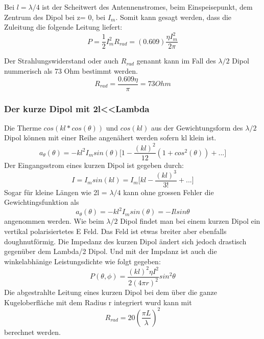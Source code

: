 Bei $l=\lambda/4 $ ist der Scheitwert des Antennenstromes, beim Einspeisepunkt, dem Zentrum des Dipol bei z= 0, bei $I_{m}$. Somit kann gesagt werden, dass die Zuleitung  die folgende Leitung  liefert:
\begin{equation}
P=\frac{1}{2} I_{m}^{2}R_{rad}=(0.609)\frac{\eta I_{m}^{2}}{2\pi}
\end{equation}

Der Strahlungswiderstand oder auch $R_{rad}$ genannt kann im Fall des $\lambda /2$ Dipol nummerisch als 73 Ohm bestimmt werden.
\begin{equation}
R_{rad}=\frac{0.609 \eta}{\pi}= 73 Ohm
\end{equation}
\subsubsection{Der kurze Dipol mit 2l<<Lambda}
Die Therme $cos(kl*cos(\theta)) $ und $cos(kl)$ aus der Gewichtungsform des $\lambda/2$ Dipol können mit einer Reihe angenähert werden sofern kl klein ist.
\begin{equation}
a_{\theta}(\theta)=-kl^{2}I_{m}sin(\theta) \lbrack 1- \frac{(kl)^{2}}{12}(1+cos^{2}(\theta))+...\rbrack
\end{equation}
Der Eingangsstrom eines kurzen Dipol ist gegeben durch:
\begin{equation}
I=I_{m}sin(kl)=I_{m}\lbrack kl - \frac{(kl)^{3}}{3!} +... \rbrack
\end{equation}
Sogar für kleine Längen wie 2l = $\lambda/4 $ kann ohne grossen Fehler die Gewichtingsfunktion als 
\begin{equation}
a_{\theta}(\theta)=-kl^{2}I_{m}sin(\theta)=-Ilsin\theta
\end{equation}
angenommen werden.
Wie beim $\lambda/2$ Dipol findet man bei einem kurzen Dipol ein vertikal polarisiertetes E Feld. Das Feld ist etwas breiter aber ebenfalls doughnutförmig. Die Impedanz des kurzen Dipol ändert sich jedoch drastisch gegenüber dem Lambda/2 Dipol. Und mit der Impdanz ist auch die winkelabhänige Leistungsdichte wie folgt gegeben:
\begin{equation}
P(\theta,\phi)=\frac{(kl)^{2}\eta I^{2}}{2(4\pi r)^{2}}sin^{2}\theta
\end{equation}
Die abgestrahlte Leitung eines kurzen Dipol bei dem über die ganze Kugeloberfläche mit dem Radius r integriert wurd kann mit
\begin{equation}
R_{rad}=20(\frac{\pi L}{\lambda})^{2}
\end{equation}
berechnet werden.\\

